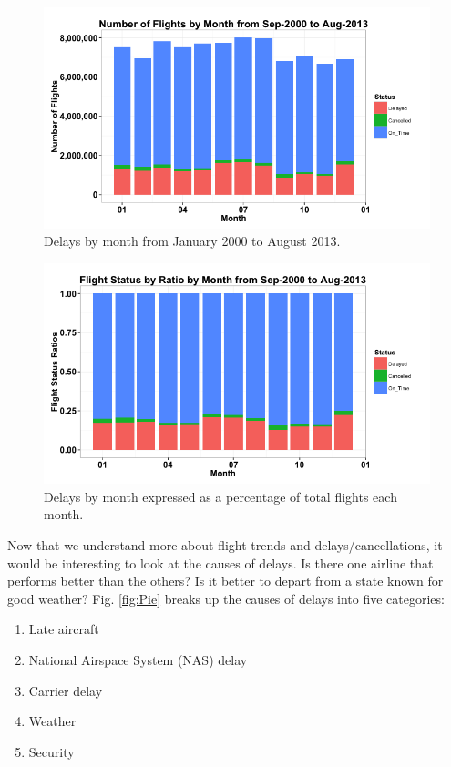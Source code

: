 \documentclass[11pt,twoside,titlepage]{article}
\begin{document}
\begin{figure}[h!]
        \centering
                \includegraphics[width=16cm]{Bar1.png}
        \caption{Delays by month from January 2000 to August 2013.}\label{fig:Flights by Month}
\end{figure}

\begin{figure}[h!]
        \centering
                \includegraphics[width=16cm]{Bar2.png}
        \caption{Delays by month expressed as a percentage of total flights each month.}\label{fig:Flights by Month Percentage}
\end{figure}

\break

Now that we understand more about flight trends and delays/cancellations, it would be interesting to look at the causes of delays. Is there one airline that performs better than the others? Is it better to depart from a state known for good weather? Fig. \ref{fig:Pie} breaks up the causes of delays into five categories:

\begin{enumerate}\itemsep1pt \parskip0pt 
  \item Late aircraft
  \item National Airspace System (NAS) delay
  \item Carrier delay
  \item Weather
  \item Security
\end{enumerate}
\end{document}
